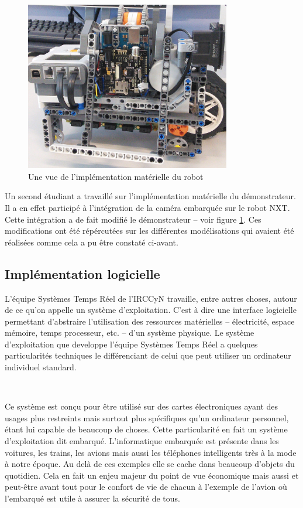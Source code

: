       ~
      
      \begin{figure}[!ht]
        \centering
        \includegraphics[width=0.8\textwidth]{./img/impl-robot.png}
        \caption{Une vue de l'implémentation matérielle du robot}
        \label{fig:impl-robot}
      \end{figure}
    
      Un second étudiant a travaillé sur l'implémentation matérielle du
      démonstrateur. Il a en effet participé à l'intégration de la caméra
      embarquée sur le robot NXT. Cette intégration a de fait modifié le
      démonstrateur -- voir figure \ref{fig:impl-robot}. Ces modifications ont
      été répércutées sur les différentes modélisations qui avaient été
      réalisées comme cela a pu être constaté ci-avant.

    \subsection{Implémentation logicielle}

      L'équipe Systèmes Temps Réel de l'IRCCyN travaille, entre autres choses,
      autour de ce qu'on appelle un système d'exploitation. C'est à dire une
      interface logicielle permettant d'abstraire l'utilisation des ressources
      matérielles -- électricité, espace mémoire, temps processeur, etc. -- d'un
      système physique. Le système d'exploitation que developpe l'équipe
      Systèmes Temps Réel a quelques particularités techniques le différenciant
      de celui que peut utiliser un ordinateur individuel standard.

      ~
    
      Ce système est conçu pour être utilisé sur des cartes électroniques ayant
      des usages plus restreints mais surtout plus spécifiques qu'un ordinateur
      personnel, étant lui capable de beaucoup de choses. Cette particularité en
      fait un système d'exploitation dit embarqué. L'informatique embarquée est
      présente dans les voitures, les trains, les avions mais aussi les
      téléphones intelligents très à la mode à notre époque. Au delà de ces
      exemples elle se cache dans beaucoup d'objets du quotidien. Cela en fait
      un enjeu majeur du point de vue économique mais aussi et peut-être avant
      tout pour le confort de vie de chacun à l'exemple de l'avion où l'embarqué
      est utile à assurer la sécurité de tous.

